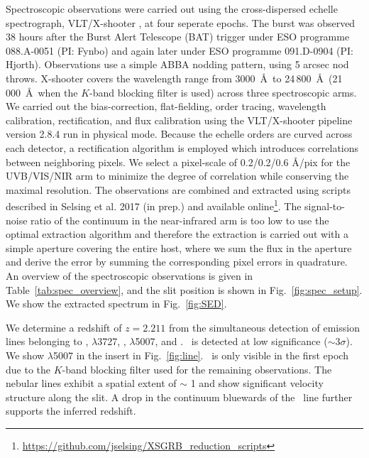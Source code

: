 \documentclass{aa}    %
\begin{document}
Spectroscopic observations were carried out using the cross-dispersed echelle
spectrograph, VLT/X-shooter \citep{Vernet2011}, at four seperate epochs. The
burst was observed 38 hours after the Burst Alert Telescope (BAT) trigger under
ESO programme 088.A-0051 (PI: Fynbo) and again later under ESO programme
091.D-0904 (PI: Hjorth). Observations use a simple ABBA nodding pattern, using 5
arcsec nod throws. X-shooter covers the wavelength range from 3000~\AA~to
24\,800~\AA~(21\,000~\AA~when the $K$-band blocking filter is used) across three
spectroscopic arms. We carried out the bias-correction, flat-fielding, order
tracing, wavelength calibration, rectification, and flux calibration using the
VLT/X-shooter pipeline version 2.8.4 \citep{Modigliani2010} run in physical
mode. Because the echelle orders are curved across each detector, a
rectification algorithm is employed which introduces correlations between
neighboring pixels. We select a pixel-scale of 0.2/0.2/0.6 \AA/pix for the
UVB/VIS/NIR arm to minimize the degree of correlation while conserving the
maximal resolution. The observations are combined and extracted using scripts
described in Selsing et al. 2017 (in prep.) and available
online\footnote{\url{https://github.com/jselsing/XSGRB_reduction_scripts}}. The
signal-to-noise ratio of the continuum in the near-infrared arm is too low to
use the optimal extraction algorithm \citep{Horne1986} and therefore the
extraction is carried out with a simple aperture covering the entire host, where
we sum the flux in the aperture and derive the error by summing the
corresponding pixel errors in quadrature. An overview of the spectroscopic
observations is given in Table~\ref{tab:spec_overview}, and the slit position is
shown in Fig.~\ref{fig:spec_setup}. We show the extracted spectrum in
Fig.~\ref{fig:SED}.



We determine a redshift of $z = 2.211$ from the simultaneous detection of
emission lines belonging to \lya, \oii$\lambda$3727, \hb, \oiii$\lambda$5007,
and \ha. \hb~is detected at low significance ($\sim 3 \sigma$). We show
\oiii$\lambda$5007 in the insert in Fig.~\ref{fig:line}.  \ha~is only visible in
the first epoch due to the $K$-band blocking filter used for the remaining
observations. The nebular lines exhibit a spatial extent of $\sim$ 1 and
show significant velocity structure along the slit. A drop in the continuum
bluewards of the \lya~line further supports the inferred redshift.
\end{document}
